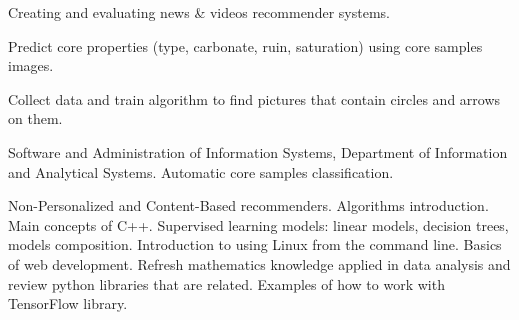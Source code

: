 \documentclass[
	a4paper,
]{fortysecondscv}
\begin{document}
\par
\makefrontsidebar{}

\begin{cvtable}[1.5]


	{Creating and evaluating news \& videos recommender systems.}

\end{cvtable}

\begin{cvtable}[1.5]


	{Predict core properties (type, carbonate, ruin, saturation)
		using core samples images.}

	{Collect data and train algorithm to find pictures that
		contain circles and arrows on them.}
\end{cvtable}



\begin{cvtable}[1.5]
	{Software and Administration of Information Systems,
		Department of Information and Analytical Systems.}
	{Automatic core samples classification.}

	{ }
\end{cvtable}

\begin{cvtable}[1.5]
	{Non-Personalized and Content-Based recommenders.}
	{Algorithms introduction.}
	{Main concepts of C++.}
	{Supervised learning models: linear models, decision trees,
		models composition.}
	{Introduction to using Linux from the command line.}
	{Basics of web development.}
	{Refresh mathematics knowledge applied in data analysis and
		review python libraries that are related.}
	{Examples of how to work with TensorFlow library.}
\end{cvtable}
\end{document}

